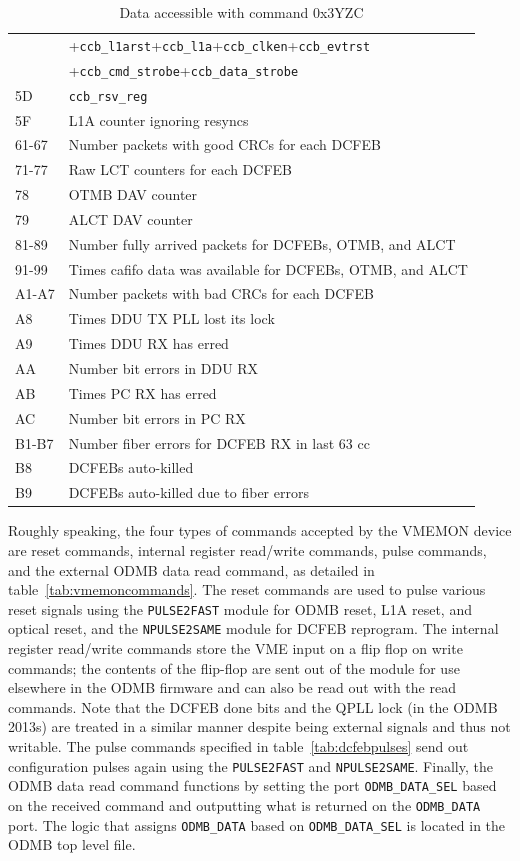\documentclass[10pt,a4paper]{article}
\begin{document}
\begin{table}[H]
\begin{tabular}{|l|l|}
  & +\texttt{ccb\_l1arst}+\texttt{ccb\_l1a}+\texttt{ccb\_clken}+\texttt{ccb\_evtrst}\\
	& +\texttt{ccb\_cmd\_strobe}+\texttt{ccb\_data\_strobe}\\ \hline
5D& \texttt{ccb\_rsv\_reg}\\ \hline
5F& L1A counter ignoring resyncs\\ \hline
61-67& Number packets with good CRCs for each DCFEB\\ \hline
71-77& Raw LCT counters for each DCFEB\\ \hline
78& OTMB DAV counter\\ \hline
79& ALCT DAV counter\\ \hline
81-89& Number fully arrived packets for DCFEBs, OTMB, and ALCT\\ \hline
91-99& Times cafifo data was available for DCFEBs, OTMB, and ALCT\\ \hline
A1-A7& Number packets with bad CRCs for each DCFEB\\ \hline
A8& Times DDU TX PLL lost its lock\\ \hline
A9& Times DDU RX has erred\\ \hline
AA& Number bit errors in DDU RX\\ \hline
AB& Times PC RX has erred\\ \hline
AC& Number bit errors in PC RX\\ \hline
B1-B7& Number fiber errors for DCFEB RX in last 63 cc\\ \hline
B8& DCFEBs auto-killed\\ \hline
B9& DCFEBs auto-killed due to fiber errors\\ \hline
\end{tabular}
\caption{Data accessible with command 0x3YZC}
\label{tab:readdata}
\end{table}

Roughly speaking, the four types of commands accepted by the VMEMON device are reset commands, internal register read/write commands, pulse commands, and the external ODMB data read command, as detailed in table~\ref{tab:vmemoncommands}. The reset commands are used to pulse various reset signals using the \texttt{PULSE2FAST} module for ODMB reset, L1A reset, and optical reset, and the \texttt{NPULSE2SAME} module for DCFEB reprogram. The internal register read/write commands store the VME input on a flip flop on write commands; the contents of the flip-flop are sent out of the module for use elsewhere in the ODMB firmware and can also be read out with the read commands. Note that the DCFEB done bits and the QPLL lock (in the ODMB 2013s) are treated in a similar manner despite being external signals and thus not writable. The pulse commands specified in table~\ref{tab:dcfebpulses} send out configuration pulses again using the \texttt{PULSE2FAST} and \texttt{NPULSE2SAME}. Finally, the ODMB data read command functions by setting the port \texttt{ODMB\_DATA\_SEL} based on the received command and outputting what is returned on the \texttt{ODMB\_DATA} port. The logic that assigns \texttt{ODMB\_DATA} based on \texttt{ODMB\_DATA\_SEL} is located in the ODMB top level file.
\end{document}
